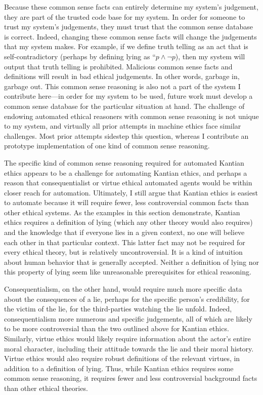 \begin{isabellebody}
\begin{isamarkuptext}
Because these common sense facts can entirely determine my system's judgement, they are part of the trusted
code base for my system. In order for someone to trust my system's judgements, they must trust that the
common sense database is correct. Indeed, changing these common sense facts will change the judgements 
that my system makes. For example, if we define truth telling as an act that is self-contradictory (perhaps
by defining lying as ``$p \wedge \neg p$), then my system will output that truth telling is prohibited.
Malicious common sense facts and definitions will result in bad ethical judgements. In other words, garbage in, 
garbage out. This common sense reasoning is also not a part of the system I contribute here—in order for my
system to be used, future work must develop a common sense database for the particular situation at hand. 
The challenge of endowing automated ethical reasoners with common sense reasoning is not unique to my 
system, and virtually all prior attempts in machine ethics face similar challenges. Most prior attempts
sidestep this question, whereas I contribute an prototype implementation of one kind of common sense reasoning.

The specific kind of common sense reasoning required for automated Kantian ethics appears to be a challenge 
for automating Kantian ethics, and perhaps a reason that consequentialist or virtue ethical automated
agents would be within closer reach for automation. Ultimately, I still argue that Kantian ethics is 
easiest to automate because it will require fewer, less controversial common facts than other ethical
systems. As the examples in this section demonstrate, Kantian ethics requires a definition of lying (which any other 
theory would also requires) and the knowledge that if everyone lies in a given context, no one will believe 
each other in that particular context. This latter fact may not be required for every ethical theory, 
but is relatively uncontroversial. It is a kind of intuition about human behavior that is generally accepted. 
Neither a definition of lying nor this property of lying seem like unreasonable prerequisites for ethical reasoning. 

Consequentialism, on the other hand, would require much more specific data about the consequences of 
a lie, perhaps for the specific person's credibility, for the victim of the lie, for the third-parties 
watching the lie unfold. Indeed, consequentialism more numerous and specific judgements, all of which are 
likely to be more controversial than the two outlined above for Kantian ethics. Similarly, virtue ethics
would likely require information about the actor's entire moral character, including their attitude
towards the lie and their moral history. Virtue ethics would also require robust definitions of the 
relevant virtues, in addition to a definition of lying. Thus, while Kantian ethics requires some 
common sense reasoning, it requires fewer and less controversial background facts than other ethical theories.


\end{isamarkuptext}
\end{isabellebody}
